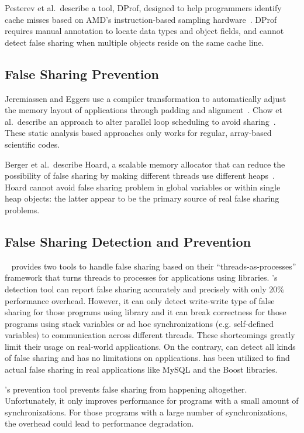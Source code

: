 Pesterev et al.\ describe a tool, DProf, designed to help programmers identify cache misses based on
AMD's instruction-based sampling hardware~\cite{DProf}.
DProf requires manual annotation to locate data types and object fields, and cannot detect false
sharing when multiple objects reside on the same cache line.

\subsection{False Sharing Prevention}
Jeremiassen and Eggers use a compiler transformation to automatically adjust the
memory layout of applications through padding and alignment~\cite{falseshare:compile}.
Chow et al.\ describe an approach to alter parallel loop scheduling to avoid
sharing~\cite{falseshare:schedule}.
These static analysis based approaches only works for regular,
array-based scientific codes.

Berger et al.\ describe Hoard, a scalable memory allocator that can
reduce the possibility of false sharing by making different threads
use different heaps~\cite{Hoard}. Hoard 
cannot avoid false sharing problem in global variables or within
single heap objects: the latter appear to be the primary source of
real false sharing problems.

\subsection{False Sharing Detection and Prevention}
\sheriff{}~\cite{sheriff} provides two tools to handle false sharing based on 
their ``threads-as-processes'' framework that turns threads to processes for applications using 
\pthreads{} libraries.
\Sheriff{}'s detection tool 
can report false sharing accurately and precisely with only $20\%$ performance overhead.
However, it can only detect write-write type of false sharing for those programs 
using \pthreads{} library and it can break correctness for those programs using 
stack variables or ad hoc synchronizations (e.g. self-defined variables)
to communication across different threads.
These shortcomings greatly limit their usage on real-world applications.  
On the contrary, \Predator{} can detect all kinds of false sharing and has no limitations on applications.
\Predator{} has been utilized to find actual false sharing in real applications like MySQL and the Boost libraries.

\Sheriff{}'s prevention tool prevents false sharing from happening altogether.
Unfortunately, it only improves performance for programs with a small amount of synchronizations. 
For those programs with a large number 
of synchronizations, the overhead could lead to performance degradation.

